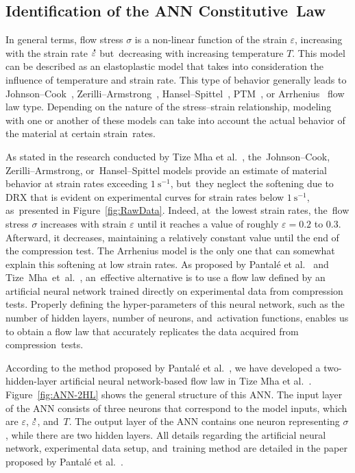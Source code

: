 \documentclass[metals,article,accept,pdftex,moreauthors]{Definitions/mdpi}
\makeatletter
\DeclareRobustCommand{\mdot}[1]{\accentset{\mbox{\bfseries .}}{#1}}
\DeclareRobustCommand{\eal}{et al.\@\xspace}
\DeclareRobustCommand{\ps}{\text{s}^{-1}}
\makeatother
\begin{document}
\subsection{Identification of the ANN Constitutive~Law}\label{subsec:ANNConstitutiveLaw}

In general terms, flow stress $\sigma$ is a non-linear function of the strain $\varepsilon$, increasing with the strain rate $\mdot\varepsilon$ but~decreasing with increasing temperature $T$.
This model can be described as an elastoplastic model that takes into consideration the influence of temperature and strain rate.
This type of behavior generally leads to Johnson--Cook~\cite{Johnson-1983}, Zerilli--Armstrong~\cite{Zerilli-1987}, Hansel--Spittel~\cite{Hensel-1978}, PTM~\cite{TizeMha-2023}, or Arrhenius~\cite{Sellars-1966} flow law type.
Depending on the nature of the stress--strain relationship, modeling with one or another of these models can take into account the actual behavior of the material at certain strain~rates.

As stated in the research conducted by Tize Mha \eal~\cite{TizeMha-2023}, the~Johnson--Cook, Zerilli--Armstrong, or~Hansel--Spittel models provide an estimate of material behavior at strain rates exceeding $1~\ps$, but~they neglect the softening due to DRX that is evident on experimental curves for strain rates below $1~\ps$, as~presented in Figure~\ref{fig:RawData}.
Indeed, at~the lowest strain rates, the~flow stress $\sigma$ increases with strain $\varepsilon$ until it reaches a value of roughly $\varepsilon=0.2$ to $0.3$.
Afterward, it decreases, maintaining a relatively constant value until the end of the compression test.
The Arrhenius model is the only one that can somewhat explain this softening at low strain rates.
As proposed by Pantalé \eal~\cite{Pantale-2021} and \mbox{Tize Mha \eal~\cite{TizeMha-2023},} an~effective alternative is to use a flow law defined by an artificial neural network trained directly on experimental data from compression tests.
Properly defining the hyper-parameters of this neural network, such as the number of hidden layers, number of neurons, and~activation functions, enables us to obtain a flow law that accurately replicates the data acquired from compression~tests.

According to the method proposed by Pantalé \eal~\cite{Pantale-2021}, we have developed a two-hidden-layer artificial neural network-based flow law in Tize Mha \eal~\cite{TizeMha-2023}.
Figure~\ref{fig:ANN-2HL} shows the general structure of this ANN.
The input layer of the ANN consists of three neurons that correspond to the model inputs, which are $\varepsilon$, $\mdot\varepsilon$, and~$T$.
The output layer of the ANN contains one neuron representing $\sigma$, while there are two hidden layers.
All details regarding the artificial neural network, experimental data setup, and~training method are detailed in the paper proposed by Pantalé \eal~\cite{Pantale-2021}.
\end{document}
